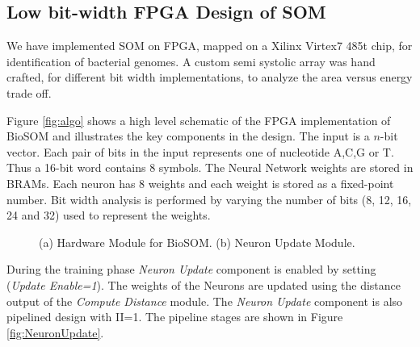 \documentclass[a4paper,10pt]{article}
\begin{document}
\subsection{Low bit-width FPGA Design of SOM}
We have implemented SOM on FPGA, mapped on a Xilinx Virtex7 485t chip, for identification of bacterial genomes. A custom semi systolic array was hand crafted, for different bit width implementations, to analyze the area versus energy trade off.

Figure \ref{fig:algo} shows a high level schematic of the FPGA implementation of BioSOM and illustrates the key components in the design. The input is a $n$-bit vector. Each pair of bits in the input represents one of nucleotide A,C,G or T. Thus a 16-bit word contains 8 symbols.  The Neural Network weights are stored in BRAMs. Each neuron has 8 weights and each weight is stored as a fixed-point number. Bit width analysis is performed by varying the number of bits (8, 12, 16, 24 and 32) used to represent the weights.

\begin{figure}[!htb]
	\centering
	\hfil
	\caption{(a) Hardware Module for BioSOM. (b) Neuron Update Module.}	\label{fig:SOMFPGAImplementation}
	\vspace{-1.0em}	
\end{figure}

During the training phase \textit{Neuron Update} component is enabled by setting (\textit{Update Enable=1}). The weights of the Neurons are updated using the distance output of the \textit{Compute Distance} module. The \textit{Neuron Update} component is also pipelined design with II=1. The pipeline stages are shown in Figure \ref{fig:NeuronUpdate}.
\end{document}

